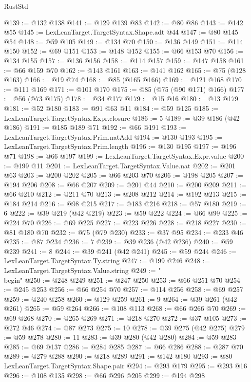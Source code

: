 \begin{lexlean}{RustStd}
\begin{coremodule}
@139 := @132 @138
@141 := @129 @139 @83
@142 := @80 @86
@143 := @142 @55
@145 := LexLeanTarget.TargetSyntax.Shape.adt @44
@147 := @80 @145 @54
@148 := @59 @105
@149 := @134 @70
@150 := @136 @149
@151 := @114 @150
@152 := @69 @151
@153 := @148 @152
@155 := @66 @153 @70
@156 := @134 @155
@157 := @136 @156
@158 := @114 @157
@159 := @147 @158
@161 := @66 @159 @70
@162 := @143 @161
@163 := @141 @162
@165 := @75 (@128 @163)
@166 := @19 @74
@168 := @85 (@165 @166)
@169 := @121 @168
@170 := @111 @169
@171 := @101 @170
@175 := @85 (@75 (@90 @171) @166)
@177 := @56 (@73 @175)
@178 := @34 @177
@179 := @15 @16
@180 := @13 @179
@181 := @52 @180
@183 := @91 @63 @11
@184 := @59 @125
@185 := LexLeanTarget.TargetSyntax.Expr.closure
@186 := 5
@189 := @39 @186 (@42 @186)
@191 := @185 @189 @71
@192 := @66 @191
@193 := LexLeanTarget.TargetSyntax.Prim.natAdd
@194 := @130 @193
@195 := LexLeanTarget.TargetSyntax.Prim.length
@196 := @130 @195
@197 := @196 @71
@198 := @66 @197
@199 := LexLeanTarget.TargetSyntax.Expr.value
@200 := @199 @11
@201 := LexLeanTarget.TargetSyntax.Value.nat
@202 := @201 @63
@203 := @200 @202
@205 := @66 @203 @70
@206 := @198 @205
@207 := @194 @206
@208 := @66 @207
@209 := @201 @44
@210 := @200 @209
@211 := @66 @210
@212 := @211 @70
@213 := @208 @212
@214 := @192 @213
@215 := @184 @214
@216 := @98 @215
@217 := @183 @216
@218 := @57 @180
@219 := 6
@222 := @39 @219 (@42 @219)
@223 := @59 @222
@224 := @66 @99
@225 := @224 @70
@226 := @69 @225
@227 := @223 @226
@228 := @218 @227
@230 := @81 @180 @70
@232 := @75 (@79 @230)
@233 := @37 @95
@234 := @233 @46
@235 := @87 @234
@236 := 7
@239 := @39 @236 (@42 @236)
@240 := @59 @239
@241 := 8
@244 := @39 @241 (@42 @241)
@245 := @59 @244
@246 := LexLeanTarget.TargetSyntax.Ty.string
@247 := @199 @246
@248 := LexLeanTarget.TargetSyntax.Value.string
@249 := "\\begin"
@250 := @248 @249
@251 := @247 @250
@253 := @66 @251 @70
@254 := @245 @253
@256 := @66 @254 @70
@257 := @114 @256
@258 := @69 @257
@259 := @240 @258
@260 := @129 @259
@261 := 9
@264 := @39 @261 (@42 @261)
@265 := @59 @264
@266 := @108 @113
@268 := @66 @266 @70
@269 := @69 @268
@270 := @265 @269
@271 := @218 @270
@272 := @37 @105
@273 := @272 @46
@274 := @87 @273
@275 := 10
@278 := @39 @275 (@42 @275)
@279 := @59 @278
@280 := 11
@283 := @39 @280 (@42 @280)
@284 := @59 @283
@285 := @69 @137
@286 := @284 @285
@287 := @66 @286
@288 := @287 @70
@289 := @279 @288
@290 := @218 @289
@291 := @142 @180
@293 := @80 LexLeanTarget.TargetSyntax.Shape.pair
@294 := @293 @179
@295 := @293 @16
@296 := @108 @135
@298 := @66 @296 @205
@299 := @194 @298

\end{coremodule}
\end{lexlean}
